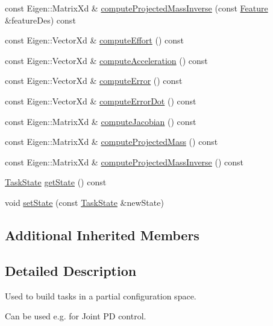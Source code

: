 \begin{DoxyCompactItemize}
\item 
const Eigen\+::\+Matrix\+Xd \& \hyperlink{classocra_1_1PartialStateFeature_acebec8dd4cadc55641a9286fb3685674}{compute\+Projected\+Mass\+Inverse} (const \hyperlink{classocra_1_1Feature}{Feature} \&feature\+Des) const
\item 
const Eigen\+::\+Vector\+Xd \& \hyperlink{classocra_1_1PartialStateFeature_abc447a46a7bb1b4480af965119d23214}{compute\+Effort} () const
\item 
const Eigen\+::\+Vector\+Xd \& \hyperlink{classocra_1_1PartialStateFeature_a7ed5a87165deed25a91f073e348c53a3}{compute\+Acceleration} () const
\item 
const Eigen\+::\+Vector\+Xd \& \hyperlink{classocra_1_1PartialStateFeature_a7d412f45a1ae3ce72a82cee84cdddc7e}{compute\+Error} () const
\item 
const Eigen\+::\+Vector\+Xd \& \hyperlink{classocra_1_1PartialStateFeature_a946499ed311c24cb0cd9953b51b7d170}{compute\+Error\+Dot} () const
\item 
const Eigen\+::\+Matrix\+Xd \& \hyperlink{classocra_1_1PartialStateFeature_a134ada6399c8f4bda311844c79cd5467}{compute\+Jacobian} () const
\item 
const Eigen\+::\+Matrix\+Xd \& \hyperlink{classocra_1_1PartialStateFeature_a984c0fd5400ff69faaab55d81cf8320b}{compute\+Projected\+Mass} () const
\item 
const Eigen\+::\+Matrix\+Xd \& \hyperlink{classocra_1_1PartialStateFeature_a1e1a569e8472551e91845e585c30c4ca}{compute\+Projected\+Mass\+Inverse} () const
\item 
\hyperlink{classocra_1_1TaskState}{Task\+State} \hyperlink{classocra_1_1PartialStateFeature_abb71a3727198affb3d250e6942fb6eee}{get\+State} () const
\item 
void \hyperlink{classocra_1_1PartialStateFeature_a89e830a1d3bea028431c4ae0844a6d95}{set\+State} (const \hyperlink{classocra_1_1TaskState}{Task\+State} \&new\+State)
\end{DoxyCompactItemize}
\subsection*{Additional Inherited Members}


\subsection{Detailed Description}
Used to build tasks in a partial configuration space. 

Can be used e.\+g. for Joint PD control. 

